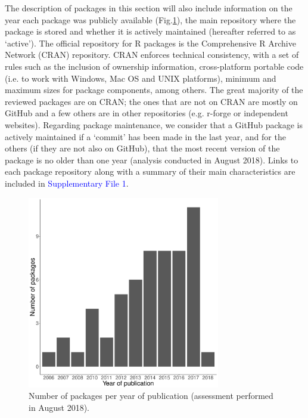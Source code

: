 \documentclass[a4paper,12pt]{article}
\begin{document}
The description of packages in this section %
will also include information on the year each package was publicly available (Fig.\ref{fig:PkgYear}), the main repository where the package is stored and whether it is actively maintained (hereafter referred to as `active'). The official repository for R packages is the Comprehensive R Archive Network (CRAN) repository. CRAN enforces technical consistency, with a set of rules such as the inclusion of ownership information, cross-platform portable code (i.e. to work with Windows, Mac OS and UNIX platforms), minimum and maximum sizes for package components, among others. The great majority of the reviewed packages are on CRAN; the ones that are not on CRAN are mostly on GitHub and a few others are in other repositories (e.g. r-forge or independent websites). Regarding package maintenance, we consider that a GitHub package is actively maintained if a `commit' has been made in the last year, and for the others (if they are not also on GitHub), that the most recent version of the package is no older than one year (analysis conducted in August 2018). Links to each package repository along with a summary of their main characteristics are included in \textcolor{blue}{Supplementary File 1}. 

\begin{figure}
	\centering
	\includegraphics[width=0.75\textwidth]{./mes_images/packages_per_year.pdf}
	\caption{\label{fig:PkgYear} Number of packages per year of publication (assessment performed in August 2018).}
\end{figure} 
\end{document}

